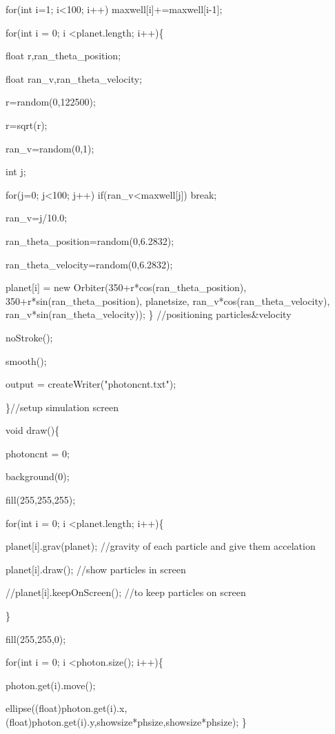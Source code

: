 \documentclass{gshs-hutech}
\begin{document}
\begin{tiny}
for(int i=1; i\textless100; i++) maxwell[i]+=maxwell[i-1];

for(int i = 0; i \textless planet.length; i++)\{

float r,ran\_theta\_position;

float ran\_v,ran\_theta\_velocity;

r=random(0,122500);

r=sqrt(r);

ran\_v=random(0,1);

int j;

for(j=0; j\textless 100; j++) if(ran\_v\textless maxwell[j]) break;

ran\_v=j/10.0;

ran\_theta\_position=random(0,6.2832);

ran\_theta\_velocity=random(0,6.2832);

planet[i] = new Orbiter(350+r*cos(ran\_theta\_position), 350+r*sin(ran\_theta\_position), planetsize, ran\_v*cos(ran\_theta\_velocity), ran\_v*sin(ran\_theta\_velocity));
\}                                                    //positioning particles\&velocity

noStroke();

smooth();

output = createWriter("photoncnt.txt");

\}//setup simulation screen

void draw()\{

photoncnt = 0;

background(0);

fill(255,255,255);

for(int i = 0; i \textless planet.length; i++)\{

planet[i].grav(planet);                                                                              //gravity of each particle and give them accelation

planet[i].draw();                                                                                             //show particles in screen

//planet[i].keepOnScreen();                                                                                     //to keep particles on screen

\}

fill(255,255,0);

for(int i = 0; i \textless photon.size(); i++)\{

photon.get(i).move();

ellipse((float)photon.get(i).x,(float)photon.get(i).y,showsize*phsize,showsize*phsize);
\}


\end{tiny}
\end{document}
